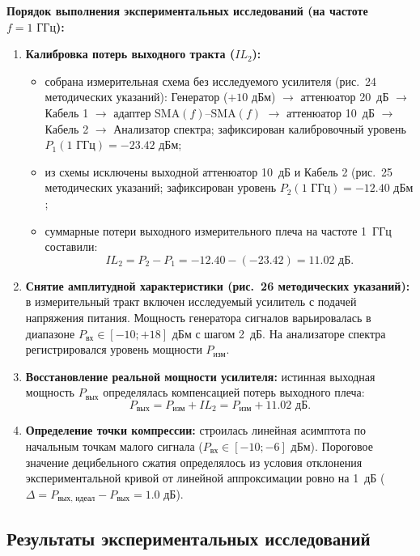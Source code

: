 \textbf{Порядок выполнения экспериментальных исследований (на частоте $f = 1\text{ ГГц}$):}
\begin{enumerate}
    \item \textbf{Калибровка потерь выходного тракта ($IL_2$):}
    \begin{itemize}
        \item собрана измерительная схема без исследуемого усилителя (рис.~24 методических указаний): Генератор ($+10\text{ дБм}$) $\to$ аттенюатор 20~дБ $\to$ Кабель 1 $\to$ адаптер $\text{SMA}(f)\text{--}\text{SMA}(f)$ $\to$ аттенюатор 10~дБ $\to$ Кабель 2 $\to$ Анализатор спектра; зафиксирован калибровочный уровень $P_1(1\text{ ГГц}) = -23.42\text{ дБм}$;
        \item из схемы исключены выходной аттенюатор 10~дБ и Кабель 2 (рис.~25 методических указаний; зафиксирован уровень $P_2(1\text{ ГГц}) = -12.40\text{ дБм}$;
        \item суммарные потери выходного измерительного плеча на частоте 1~ГГц составили:
        \begin{equation}
        IL_2 = P_2 - P_1 = -12.40 - (-23.42) = 11.02\text{ дБ}.
        \end{equation}
    \end{itemize}
    \item \textbf{Снятие амплитудной характеристики (рис.~26 методических указаний):} в измерительный тракт включен исследуемый усилитель с подачей напряжения питания. Мощность генератора сигналов варьировалась в диапазоне $P_{\text{вх}} \in [-10; +18]\text{ дБм}$ с шагом 2~дБ. На анализаторе спектра регистрировался уровень мощности $P_{\text{изм}}$.
    \item \textbf{Восстановление реальной мощности усилителя:} истинная выходная мощность $P_{\text{вых}}$ определялась компенсацией потерь выходного плеча:
    \begin{equation}
    P_{\text{вых}} = P_{\text{изм}} + IL_2 = P_{\text{изм}} + 11.02\text{ дБ}.
    \end{equation}
    \item \textbf{Определение точки компрессии:} строилась линейная асимптота по начальным точкам малого сигнала ($P_{\text{вх}} \in [-10; -6]\text{ дБм}$). Пороговое значение децибельного сжатия определялось из условия отклонения экспериментальной кривой от линейной аппроксимации ровно на 1~дБ ($\Delta = P_{\text{вых, идеал}} - P_{\text{вых}} = 1.0\text{ дБ}$).
\end{enumerate}

\subsection{Результаты экспериментальных исследований}

